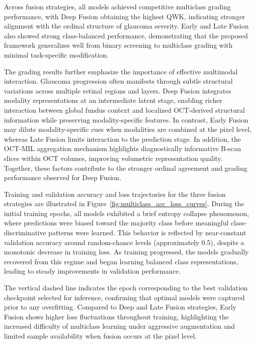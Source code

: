 \documentclass[preprint,12pt]{elsarticle}
\begin{document}
Across fusion strategies, all models achieved competitive multiclass grading performance, with Deep Fusion obtaining the highest QWK, indicating stronger alignment with the ordinal structure of glaucoma severity. Early and Late Fusion also showed strong class-balanced performance, demonstrating that the proposed framework generalizes well from binary screening to multiclass grading with minimal task-specific modification.

The grading results further emphasize the importance of effective multimodal interaction. Glaucoma progression often manifests through subtle structural variations across multiple retinal regions and layers. Deep Fusion integrates modality representations at an intermediate latent stage, enabling richer interaction between global fundus context and localized OCT-derived structural information while preserving modality-specific features. In contrast, Early Fusion may dilute modality-specific cues when modalities are combined at the pixel level, whereas Late Fusion limits interaction to the prediction stage. In addition, the OCT-MIL aggregation mechanism highlights diagnostically informative B-scan slices within OCT volumes, improving volumetric representation quality. Together, these factors contribute to the stronger ordinal agreement and grading performance observed for Deep Fusion.

Training and validation accuracy and loss trajectories for the three fusion strategies are illustrated in Figure~\ref{fig:multiclass_acc_loss_curves}. During the initial training epochs, all models exhibited a brief entropy collapse phenomenon, where predictions were biased toward the majority class before meaningful class-discriminative patterns were learned. This behavior is reflected by near-constant validation accuracy around random-chance levels (approximately 0.5), despite a monotonic decrease in training loss. As training progressed, the models gradually recovered from this regime and began learning balanced class representations, leading to steady improvements in validation performance.

The vertical dashed line indicates the epoch corresponding to the best validation checkpoint selected for inference, confirming that optimal models were captured prior to any overfitting. Compared to Deep and Late Fusion strategies, Early Fusion shows higher loss fluctuations throughout training, highlighting the increased difficulty of multiclass learning under aggressive augmentation and limited sample availability when fusion occurs at the pixel level.
\end{document}
